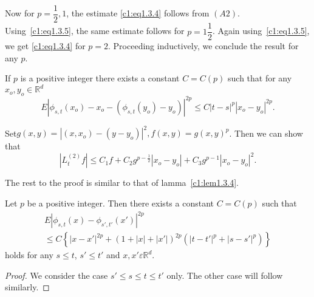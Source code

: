 Now for $p = \dfrac{1}{2},1$, the estimate \eqref{c1:eq1.3.4} follows from
$(A2)$. Using~\eqref{c1:eq1.3.5}, the same estimate follows for $p =1
\dfrac{1}{2}$. Again using~\eqref{c1:eq1.3.5}, we get \eqref{c1:eq1.3.4} for
$p=2$. Proceeding inductively, we conclude the result for any $p$.  

\setcounter{remark}{4}
\begin{remark}\label{c1:rem1.3.5}%
  If $p$ is a positive integer there exists a constant $C = C(p)$ such
  that for any $x_o,y_o \in \mathbb{R}^d$ 
  \begin{equation*}
    E|\phi_{s,t} (x_o)-x_o-(\phi_{s,t} (y_o)-y_o)|^{2p} \le C
    |t-s|^p|x_o-y_o|^{2p}. \tag{1.3.6} \label{c1:eq1.3.6}
  \end{equation*}
\end{remark}

Set\pageoriginale $g (x,y) = |(x,x_o)-(y-y_o)|^2, f(x,y) = g(x,y)^p$. 
Then we can show that
$$
|L^{(2)}_t f|\le C_1 f + C_{2} g^{p -\frac{1}{2}} |x_o-y_o|+C_3g^{p-1}
|x_o-y_o|^2. 
$$

The rest to the proof is similar to that of lamma~\ref{c1:lem1.3.4}.

\setcounter{Lemma}{5}
\begin{Lemma}\label{c1:lem1.3.6}%
  Let $p$ be a positive integer. Then there exists a constant $C=C(p)$
  such that 
  \begin{multline*}
    E|\phi_{s,t}{(x)}- \phi_{s',t'}{{(x')}}|^{2p}\\ 
    \le C \left\{|x-x'|^{2p} +
    (1+|x|+|x'|)^{2p} (|t-t'|^p + |s-s'|^p)\right\} \tag{1.3.7}\label{c1:eq1.3.7} 
  \end{multline*}
  holds for any $s \le t$, $s' \le t'$ and $x,x' \varepsilon
  \mathbb{R}^d$. 
\end{Lemma}

\begin{proof}
  We consider the case $s' \le s \le t \le t'$ only. The other case
  will follow similarly.  
\end{proof}

